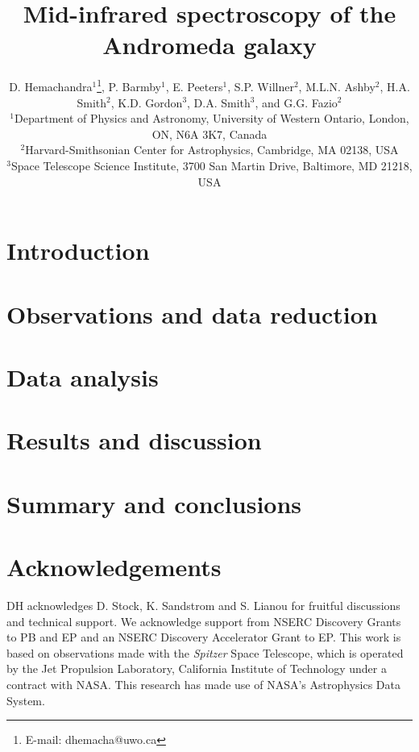 \documentclass[useAMS,usenatbib,a4paper]{mn2e}
\title[Mid-infrared spectroscopy of M31]{Mid-infrared spectroscopy of the Andromeda galaxy}
\author[D. Hemachandra et al.]
{D. Hemachandra$^{1}$\thanks{E-mail: dhemacha@uwo.ca},
P. Barmby$^{1}$, 
E. Peeters$^{1}$, 
S.P. Willner$^{2}$, 
M.L.N. Ashby$^{2}$,
H.A. Smith$^{2}$, 
\newauthor 
K.D. Gordon$^{3}$,
D.A. Smith$^{3}$,
and
G.G. Fazio$^{2}$\\
$^{1}$Department of Physics and Astronomy, University of Western Ontario, London, ON, N6A 3K7, Canada\\
$^{2}$Harvard-Smithsonian Center for Astrophysics, Cambridge, MA 02138, USA\\
$^{3}$Space Telescope Science Institute, 3700 San Martin Drive, Baltimore, MD 21218, USA
}
\begin{document}
\date{}

\maketitle

\label{firstpage}



\section{Introduction}



\section{Observations and data reduction}



\section{Data analysis}
\label{sect:data_analysis}



\section{Results and discussion}



\section{Summary and conclusions}



\section*{Acknowledgements}


DH acknowledges D. Stock, K. Sandstrom and S. Lianou for fruitful discussions and technical support. 
We acknowledge support from NSERC Discovery Grants to PB and EP and an NSERC Discovery Accelerator Grant to EP. 
This work is based on observations made with the {\em Spitzer} Space Telescope, which is operated by the 
Jet Propulsion Laboratory, California Institute of Technology under a contract with NASA.
This research has made use of NASA's Astrophysics Data System.




{}

\bsp

\label{lastpage}
\end{document}
